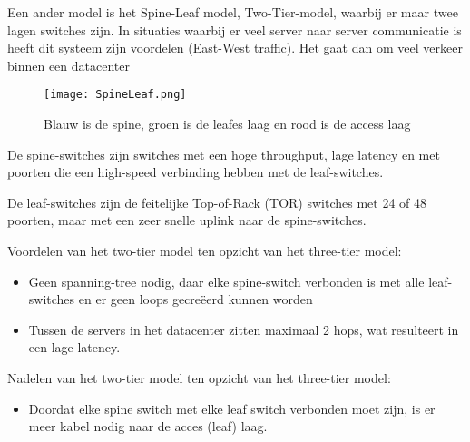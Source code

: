 Een ander model is het Spine-Leaf model, Two-Tier-model, waarbij er maar twee lagen switches zijn. In situaties waarbij er veel server naar server communicatie is heeft dit systeem zijn voordelen (East-West traffic). Het gaat dan om veel verkeer binnen een datacenter

\begin{figure}[H]
\centering
\texttt{[image: SpineLeaf.png]}
\caption{Blauw is de spine, groen is de leafes laag en rood is de access laag}
\label{SpineLeaf}
\end{figure}

De spine-switches zijn switches met een hoge throughput, lage latency en met poorten die een high-speed verbinding hebben met de leaf-switches.

De leaf-switches zijn de feitelijke Top-of-Rack (TOR) switches met 24 of 48 poorten, maar met een zeer snelle uplink naar de spine-switches.

Voordelen van het two-tier model ten opzicht van het three-tier model:
\begin{itemize}
\item Geen spanning-tree nodig, daar elke spine-switch verbonden is met alle leaf-switches en er geen loops gecre\"eerd kunnen worden
\item Tussen de servers in het datacenter zitten maximaal 2 hops, wat resulteert in een lage latency.
\end{itemize}

Nadelen van het two-tier model ten opzicht van het three-tier model:
\begin{itemize}
\item Doordat elke spine switch met elke leaf switch verbonden moet zijn, is er meer kabel nodig naar de acces (leaf) laag.
\end{itemize}
